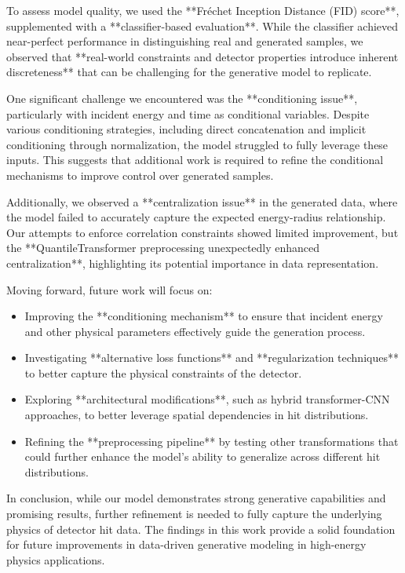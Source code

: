 To assess model quality, we used the **Fréchet Inception Distance (FID) score**, supplemented with a **classifier-based evaluation**. While the classifier achieved near-perfect performance in distinguishing real and generated samples, we observed that **real-world constraints and detector properties introduce inherent discreteness** that can be challenging for the generative model to replicate.

One significant challenge we encountered was the **conditioning issue**, particularly with incident energy and time as conditional variables. Despite various conditioning strategies, including direct concatenation and implicit conditioning through normalization, the model struggled to fully leverage these inputs. This suggests that additional work is required to refine the conditional mechanisms to improve control over generated samples.

Additionally, we observed a **centralization issue** in the generated data, where the model failed to accurately capture the expected energy-radius relationship. Our attempts to enforce correlation constraints showed limited improvement, but the **QuantileTransformer preprocessing unexpectedly enhanced centralization**, highlighting its potential importance in data representation.

Moving forward, future work will focus on:
\begin{itemize}
    \item Improving the **conditioning mechanism** to ensure that incident energy and other physical parameters effectively guide the generation process.
    \item Investigating **alternative loss functions** and **regularization techniques** to better capture the physical constraints of the detector.
    \item Exploring **architectural modifications**, such as hybrid transformer-CNN approaches, to better leverage spatial dependencies in hit distributions.
    \item Refining the **preprocessing pipeline** by testing other transformations that could further enhance the model's ability to generalize across different hit distributions.
\end{itemize}

In conclusion, while our model demonstrates strong generative capabilities and promising results, further refinement is needed to fully capture the underlying physics of detector hit data. The findings in this work provide a solid foundation for future improvements in data-driven generative modeling in high-energy physics applications.




